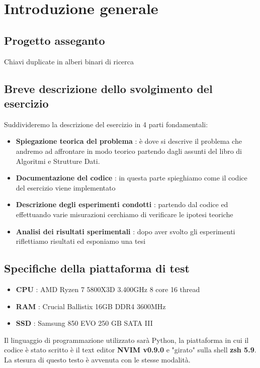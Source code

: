 \section{Introduzione generale}

\subsection{Progetto asseganto}

Chiavi duplicate in alberi binari di ricerca

\subsection{Breve descrizione dello svolgimento del esercizio}
Suddivideremo la descrizione del esercizio in 4 parti fondamentali:

\begin{itemize}
    \item \textbf{Spiegazione teorica del problema} : è dove si descrive il problema che andremo ad affrontare in modo teorico partendo dagli assunti del libro di Algoritmi e Strutture Dati.
    \item \textbf{Documentazione del codice} : in questa parte spieghiamo come il codice del esercizio viene implementato 
    \item \textbf{Descrizione degli esperimenti condotti} : partendo dal codice ed effettuando varie misurazioni cerchiamo di verificare le ipotesi teoriche
    \item \textbf{Analisi dei risultati sperimentali} : dopo aver svolto gli esperimenti riflettiamo risultati ed esponiamo una tesi
\end{itemize}

\subsection{Specifiche della piattaforma di test}

\begin{itemize}
    \item \textbf{CPU} : AMD Ryzen 7 5800X3D 3.400GHz 8 core 16 thread
    \item \textbf{RAM} : Crucial Ballistix 16GB DDR4 3600MHz
    \item \textbf{SSD} : Samsung 850 EVO 250 GB SATA III
\end{itemize}

Il linguaggio di programmazione utilizzato sarà Python, la piattaforma in cui il codice è stato scritto è il text editor \textbf{NVIM v0.9.0} e "girato" sulla shell \textbf{zsh 5.9}. La stesura di questo testo è avvenuta con le stesse modalità.
